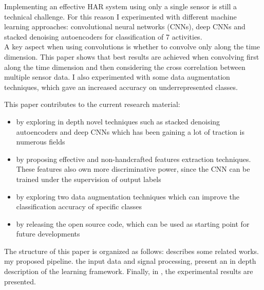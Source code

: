 Implementing an effective HAR system using only a single sensor is still a technical challenge. For this reason I experimented with different machine learning approaches: convolutional neural networks (CNNs), deep CNNs and stacked denoising autoencoders for classification of 7 activities.\\
A key aspect when using convolutions is whether to convolve only along the time dimension. This paper shows that best results are achieved when convolving first along the time dimension and then considering the cross correlation between multiple sensor data.
I also experimented with some data augmentation techniques, which gave an increased accuracy on underrepresented classes.\par

This paper contributes to the current research material:
\begin{itemize}
\item by exploring in depth novel techniques such as stacked denoising autoencoders and deep CNNs which has been gaining a lot of traction is numerous fields
\item by proposing effective and \mbox{non-handcrafted} features extraction techniques. These features also own more discriminative power, since the CNN can be trained under the supervision of output labels
\item by exploring two data augmentation techniques which can improve the classification accuracy of specific classes
\item by releasing the open source code, which can be used as starting point for future developments
\end{itemize}

The structure of this paper is organized as follows:  describes some related works.  my proposed pipeline.  the input data and signal processing,  present an in depth description of the learning framework. Finally, in , the experimental results are presented.